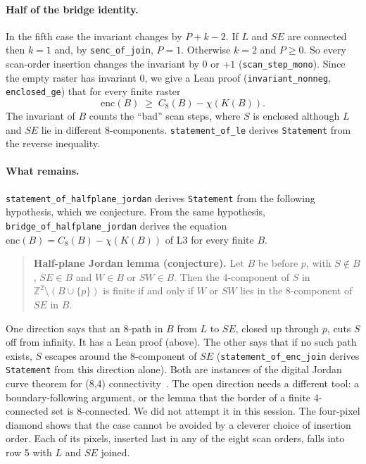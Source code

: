 \documentclass[11pt]{article}
\theoremstyle{definition}
\theoremstyle{remark}
\begin{document}
\paragraph{Half of the bridge identity.} In the fifth case the invariant changes by
$P+k-2$. If $L$ and $SE$ are connected then $k=1$ and, by \texttt{senc\_of\_join},
$P=1$. Otherwise $k=2$ and $P\ge0$. So every scan-order insertion changes the
invariant by $0$ or $+1$ (\texttt{scan\_step\_mono}). Since the empty raster has
invariant $0$, we give a Lean proof (\texttt{invariant\_nonneg}, \texttt{enclosed\_ge})
that for every finite raster
\[
  \mathrm{enc}(B) \;\ge\; C_8(B) - \chi(K(B)).
\]
The invariant of $B$ counts the ``bad'' scan steps, where $S$ is enclosed although $L$
and $SE$ lie in different 8-components. \texttt{statement\_of\_le} derives
\texttt{Statement} from the reverse inequality.

\paragraph{What remains.} \texttt{statement\_of\_halfplane\_jordan} derives
\texttt{Statement} from the following hypothesis, which we conjecture. From the
same hypothesis, \texttt{bridge\_of\_halfplane\_jordan} derives the equation
$\mathrm{enc}(B)=C_8(B)-\chi(K(B))$ of L3 for every finite $B$.

\begin{quote}
\textbf{Half-plane Jordan lemma (conjecture).} Let $B$ be before $p$, with
$S\notin B$, $SE\in B$ and $W\in B$ or $SW\in B$. Then the 4-component of $S$ in
$\mathbb{Z}^2\setminus(B\cup\{p\})$ is finite if and only if $W$ or $SW$ lies in the
8-component of $SE$ in $B$.
\end{quote}

One direction says that an 8-path in $B$ from $L$ to $SE$, closed up through $p$,
cuts $S$ off from infinity. It has a Lean proof (above). The other says that if no
such path exists, $S$ escapes around the 8-component of $SE$
(\texttt{statement\_of\_enc\_join} derives \texttt{Statement} from this direction
alone). Both are instances of the digital Jordan curve theorem for (8,4)
connectivity~\cite{Rosenfeld1970,KongRosenfeld1989}. The open direction needs
a different tool: a boundary-following argument, or the lemma that the border of a
finite 4-connected set is 8-connected. We did not attempt it in this session. The
four-pixel diamond shows that the case cannot be avoided by a cleverer choice of
insertion order. Each of its pixels, inserted last in any of the eight scan
orders, falls into row 5 with $L$ and $SE$ joined.
\end{document}
